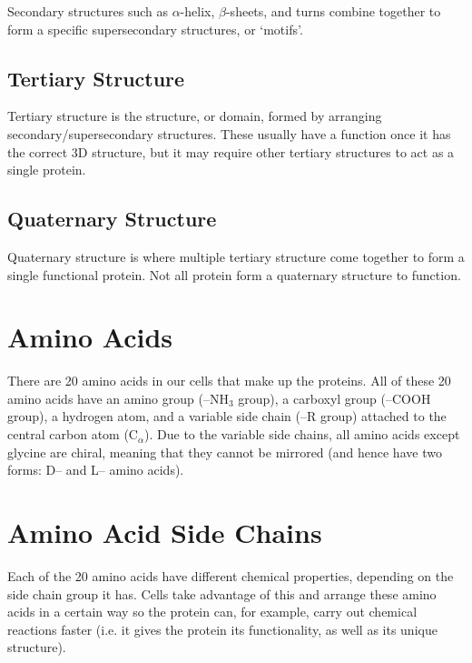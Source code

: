 \documentclass[a4paper, 12pt]{report}
\begin{document}
Secondary structures such as $\alpha$-helix, $\beta$-sheets, and turns combine together to form a specific supersecondary structures, or `motifs'.

\subsection{Tertiary Structure}

Tertiary structure is the structure, or domain, formed by arranging secondary/supersecondary structures.
These usually have a function once it has the correct 3D structure, but it may require other tertiary structures to act as a single protein.

\subsection{Quaternary Structure}

Quaternary structure is where multiple tertiary structure come together to form a single functional protein.
Not all protein form a quaternary structure to function.

\section{Amino Acids}


There are 20 amino acids in our cells that make up the proteins.
All of these 20 amino acids have an amino group (--NH$_3$ group), a carboxyl group (--COOH group), a hydrogen atom, and a variable side chain (--R group) attached to the central carbon atom (C$_{\alpha}$).
Due to the variable side chains, all amino acids except glycine are chiral, meaning that they cannot be mirrored (and hence have two forms: D-- and L-- amino acids).

\section{Amino Acid Side Chains}

Each of the 20 amino acids have different chemical properties, depending on the side chain group it has.
Cells take advantage of this and arrange these amino acids in a certain way so the protein can, for example, carry out chemical reactions faster (i.e. it gives the protein its functionality, as well as its unique structure).
\end{document}
